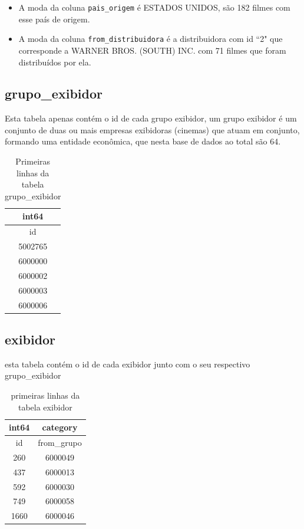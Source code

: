 \documentclass[12pt, a4paper]{article}
\begin{document}
\begin{itemize}
    \item A moda da coluna \texttt{pais\_origem} é ESTADOS UNIDOS, são 182 filmes com esse país de origem.

    \item A moda da coluna \texttt{from\_distribuidora} é a distribuidora com id ``2" que corresponde a WARNER BROS. (SOUTH) INC. com 71 filmes que foram distribuídos por ela.
\end{itemize} 

\subsection{grupo\_exibidor}

Esta tabela apenas contém o id de cada grupo exibidor, um grupo exibidor é um conjunto de duas ou mais empresas exibidoras (cinemas) que atuam em conjunto, formando uma entidade econômica, que nesta base de dados ao total são 64.
\begin{table}[h]
    \centering
    \begin{tabular}{c}
    int64\\
    \hline
    id\\
    \hline
    5002765\\
    6000000\\
    6000002\\
    6000003\\
    6000006\\
    \end{tabular}
    \caption{Primeiras linhas da tabela grupo\_exibidor}
    \label{tab:grupo_exibidor}
\end{table}

\newpage

\subsection{exibidor}
esta tabela contém o id de cada exibidor junto com o seu respectivo grupo\_exibidor 
\begin{table}[h]
    \centering
    \begin{tabular}{c|c}
    int64 & category\\
    \hline
    id & from\_grupo\\
    \hline
    260&    6000049\\
   437&    6000013\\
   592&    6000030\\
   749&    6000058\\
  1660&    6000046\\
    \end{tabular}
    \caption{primeiras linhas da tabela exibidor}
    \label{tab:exibidor}
\end{table}
\end{document}
